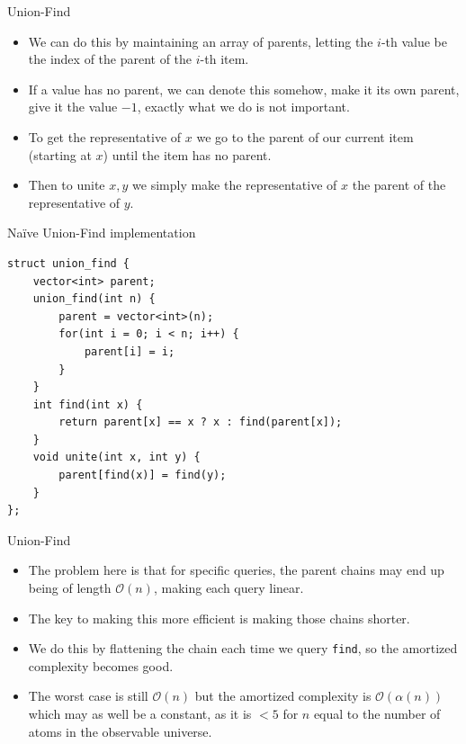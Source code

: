 \documentclass{beamer}
\begin{document}
\begin{frame}[plain]{Union-Find}
    \begin{itemize}
        \item<1-> We can do this by maintaining an array of parents, letting the $i$-th value be the index of the parent of the $i$-th item.
        \item<2-> If a value has no parent, we can denote this somehow, make it its own parent, give it the value $-1$, exactly what we do is not important.
        \item<3-> To get the representative of $x$ we go to the parent of our current item (starting at $x$) until the item has no parent.
        \item<4-> Then to unite $x, y$ we simply make the representative of $x$ the parent of the representative of $y$.
    \end{itemize}
\end{frame}

\begin{frame}{Naïve Union-Find implementation}
    \begin{verbatim}
struct union_find {
    vector<int> parent;
    union_find(int n) {
        parent = vector<int>(n);
        for(int i = 0; i < n; i++) {
            parent[i] = i;
        }
    }
    int find(int x) {
        return parent[x] == x ? x : find(parent[x]);
    }
    void unite(int x, int y) {
        parent[find(x)] = find(y);
    }
};
    \end{verbatim}
\end{frame}

\begin{frame}[plain]{Union-Find}
    \begin{itemize}
        \item<1-> The problem here is that for specific queries, the parent chains may end up being of length $\mathcal{O}(n)$, making each query linear.
        \item<2-> The key to making this more efficient is making those chains shorter.
        \item<3-> We do this by flattening the chain each time we query \texttt{find}, so the amortized complexity becomes good.
        \item<4-> The worst case is still $\mathcal{O}(n)$ but the amortized complexity is $\mathcal{O}(\alpha(n))$ which may as well be a constant, as it is $<5$ for $n$ equal to the number of atoms in the observable universe.
    \end{itemize}
\end{frame}
\end{document}
